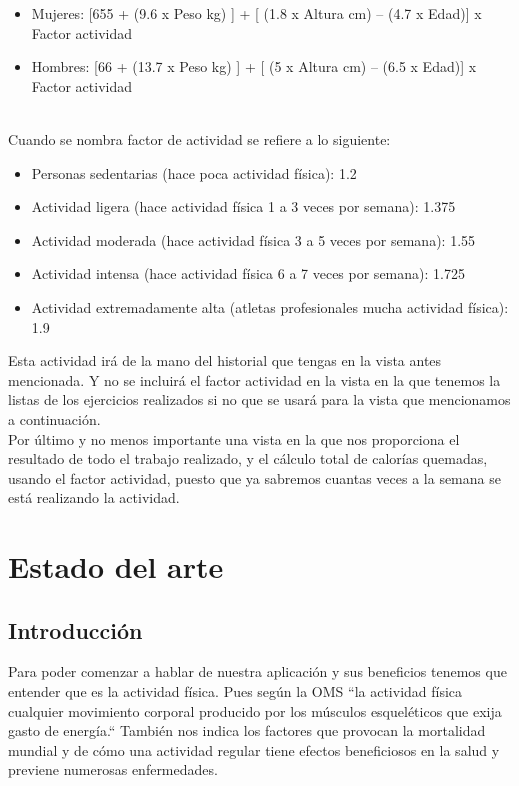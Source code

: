 \documentclass[a4paper, 11pt]{article}
\begin{document}
      \begin{itemize}
        \item{Mujeres:  [655 + (9.6 x Peso kg) ] + [ (1.8 x Altura cm) – (4.7 x Edad)] x Factor actividad}
        \item{Hombres:  [66 + (13.7 x Peso kg) ] + [ (5 x Altura cm) – (6.5 x Edad)] x Factor actividad}
      \end{itemize}
        \\Cuando se nombra factor de actividad se refiere a lo siguiente:
      \begin{itemize}
        \item{Personas sedentarias (hace poca actividad física): 1.2}
        \item{Actividad ligera (hace actividad física 1 a 3 veces por semana): 1.375}
        \item{Actividad moderada (hace actividad física 3 a 5 veces por semana): 1.55}
        \item{Actividad intensa (hace actividad física 6 a 7 veces por semana): 1.725}
        \item{Actividad extremadamente alta (atletas profesionales mucha actividad física): 1.9}
      \end{itemize}

      Esta actividad irá de la mano del historial que tengas en la vista antes
      mencionada. Y no se incluirá el factor actividad en la vista en la que tenemos
      la listas de los ejercicios realizados si no que se usará para la vista que
      mencionamos a continuación.\\

      Por último y no menos importante una vista en la que nos proporciona el
      resultado de todo el trabajo realizado, y el cálculo total de calorías quemadas,
      usando el factor actividad, puesto que ya sabremos cuantas veces a la semana se
      está realizando la actividad.\\


\section{Estado del arte}

    \subsection{Introducción}





      Para poder comenzar a hablar de nuestra aplicación y sus beneficios tenemos
      que entender que es la actividad física. Pues según la OMS ``la actividad
      física cualquier movimiento corporal producido por los músculos esqueléticos
      que exija gasto de energía.`` También nos indica los factores que provocan
      la mortalidad mundial y de cómo una actividad regular tiene efectos
      beneficiosos en la salud y previene numerosas enfermedades.\\
\end{document}
